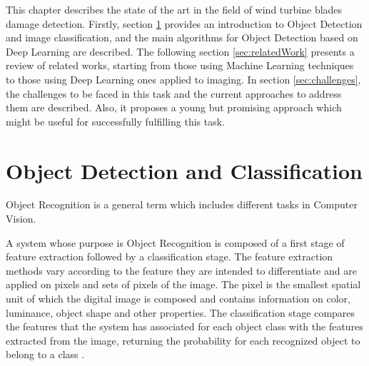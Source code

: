 \label{chapter:2}

This chapter describes the state of the art in the field of wind turbine blades damage detection. Firstly, section \ref{sec:objectDetction} provides an introduction to Object Detection and image classification, and the main algorithms for Object Detection based on Deep Learning are described. The following section \ref{sec:relatedWork} presents a review of related works, starting from those using Machine Learning techniques to those using Deep Learning ones applied to imaging. In section \ref{sec:challenges}, the challenges to be faced in this task and the current approaches to address them are described. Also, it proposes a young but promising approach which might be useful for successfully fulfilling this task.

\section{Object Detection and Classification}
\label{sec:objectDetction}

Object Recognition is a general term which includes different tasks in Computer Vision.

A system whose purpose is Object Recognition is composed of a first stage of feature extraction followed by a classification stage. The feature extraction methods vary according to the feature they are intended to differentiate and are applied on pixels and sets of pixels of the image. The pixel is the smallest spatial unit of which the digital image is composed and contains information on color, luminance, object shape and other properties. The classification stage compares the features that the system has associated for each object class with the features extracted from the image, returning the probability for each recognized object to belong to a class \cite{juli2020}.

